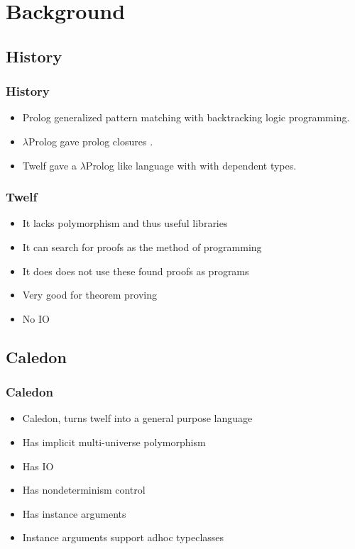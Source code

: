 \section[Background]{Background}

\subsection{History}
\begin{frame}
\frametitle{History}

\begin{itemize}
\item Prolog generalized pattern matching with backtracking logic programming.
\item $\lambda$Prolog gave prolog closures \citep{miller1988overview}.
\item Twelf \citep{pfenning1999system} gave a $\lambda$Prolog like language with with dependent types.
\end{itemize}
\end{frame}

\begin{frame}
\frametitle{Twelf}
\begin{itemize}
\item It lacks polymorphism and thus useful libraries
\item It can search for proofs as the method of programming 
\item It does does not use these found proofs as programs
\item Very good for theorem proving
\item No IO
\end{itemize}

\end{frame}

\subsection{Caledon}
\begin{frame}

\frametitle{Caledon}
\begin{itemize}
\item Caledon, turns twelf into a general purpose language
\item Has implicit multi-universe polymorphism
\item Has IO
\item Has nondeterminism control
\item Has instance arguments
\item Instance arguments support adhoc typeclasses
\end{itemize}
\end{frame}


